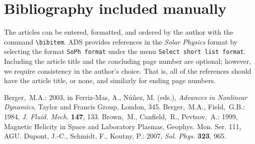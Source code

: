 \documentclass[namedreferences,hyperref,optionalrh]{spr-sola}
\newcommand{\solphys}{{\it Sol. Phys.}}
\begin{document}

  

 {\typeout{}
\typeout{****************************************************}
\typeout{****************************************************}
  
\typeout{****************************************************}
\typeout{****************************************************}
\typeout{}}

\section*{Bibliography included manually }
  The articles can be entered, formatted, and ordered  
by the author with the command \verb+\bibitem+.  ADS provides
references in the {\it Solar Physics} format by selecting
the format \verb+SoPh format+ under the menu 
\verb+Select short list format+.    Including the article title
and the concluding page number are optional;
however, we require consistency in the author's choice.
That is, all of the references should have the article title, or none,
and similarly for ending page numbers.

\begin{thebibliography}{}
Berger,~M.A.: 
2003, in Ferriz-Mas, A., N{\'u}{\~n}ez, M. (eds.),
\textit{Advances in Nonlinear Dynamics}, Taylor and Francis Group, 
London, 345.
Berger,~M.A., Field,~G.B.: 
1984, \textit{J. Fluid. Mech.} \textbf{147}, 133.
Brown,~M., Canfield,~R., Pevtsov,~A.:
1999, Magnetic Helicity in Space and Laboratory Plasmas, Geophys. Mon. 
Ser. 111, AGU.
Dupont, J.-C., Schmidt, F., Koutny, P.: 2007, \solphys{} \textbf{323}, 965. 
\end{thebibliography}
\end{document}
